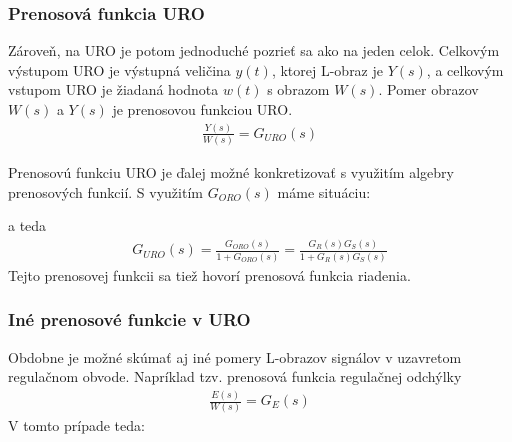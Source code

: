 \documentclass[a4paper, 10pt, ]{article}
\begin{document}
\begin{center}


	\label{schLinORO_basic.pdf}

\end{center}





\subsubsection{Prenosová funkcia URO}

Zároveň, na URO je potom jednoduché pozrieť sa ako na jeden celok. Celkovým výstupom URO je výstupná veličina $y(t)$, ktorej L-obraz je $Y(s)$, a celkovým vstupom URO je žiadaná hodnota $w(t)$ s obrazom $W(s)$. Pomer obrazov $W(s)$ a $Y(s)$ je prenosovou funkciou URO.
\begin{align}
    \frac{Y(s)}{W(s)} = G_{URO}(s)
\end{align}

Prenosovú funkciu URO je ďalej možné konkretizovať s využitím algebry prenosových funkcií. S využitím $G_{ORO}(s)$ máme situáciu:

\begin{center}


	\figcaption{}
	\label{schLinURO_basic_soro.pdf}

\end{center}

\noindent
a teda
\begin{align}
    G_{URO}(s) = \frac{G_{ORO}(s)}{1+G_{ORO}(s)} = \frac{G_R(s) G_S(s)}{1 + G_R(s) G_S(s)}
\end{align}
Tejto prenosovej funkcii sa tiež hovorí prenosová funkcia riadenia.



\subsubsection{Iné prenosové funkcie v URO}

Obdobne je možné skúmať aj iné pomery L-obrazov signálov v uzavretom regulačnom obvode. Napríklad tzv. prenosová funkcia regulačnej odchýlky
\begin{align}
    \frac{E(s)}{W(s)} = G_E(s)
\end{align}
V tomto prípade teda:
\end{document}
